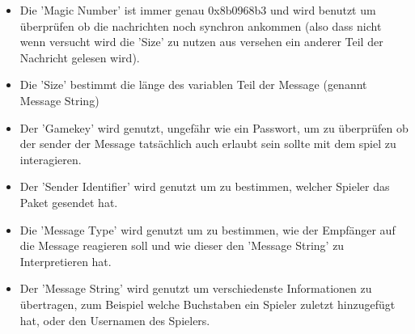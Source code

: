 \documentclass[a4paper]{article}
\begin{document}
                \vspace{20px}
                
                \begin{itemize}
                    \item Die 'Magic Number' ist immer genau 0x8b0968b3 und wird benutzt um überprüfen ob die nachrichten noch synchron ankommen (also dass nicht wenn versucht wird die 'Size' zu nutzen aus versehen ein anderer Teil der Nachricht gelesen wird).
                    \item Die 'Size' bestimmt die länge des variablen Teil der Message (genannt Message String)
                    \item Der 'Gamekey' wird genutzt, ungefähr wie ein Passwort, um zu überprüfen ob der sender der Message tatsächlich auch erlaubt sein sollte mit dem spiel zu interagieren.
                    \item Der 'Sender Identifier' wird genutzt um zu bestimmen, welcher Spieler das Paket gesendet hat.
                    \item Die 'Message Type' wird genutzt um zu bestimmen, wie der Empfänger auf die Message reagieren soll und wie dieser den 'Message String' zu Interpretieren hat.
                    \item Der 'Message String' wird genutzt um verschiedenste Informationen zu übertragen, zum Beispiel welche Buchstaben ein Spieler zuletzt hinzugefügt hat, oder den Usernamen des Spielers.
                \end{itemize}
                
\end{document}
